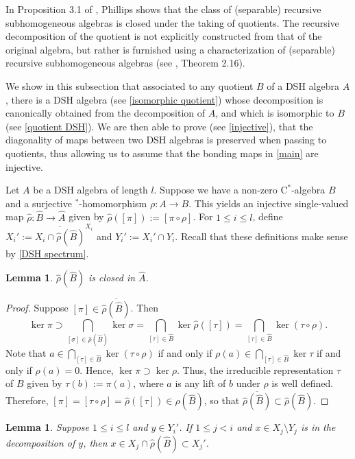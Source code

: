 \documentclass[12pt]{amsart}
\numberwithin{equation}{section}
\newtheorem{lemma}[theorem]{Lemma}
\theoremstyle{definition}
\theoremstyle{remark}
\begin{document}
In Proposition 3.1 of \cite{phil}, Phillips shows that the class of (separable) recursive subhomogeneous algebras is closed under the taking of quotients. The recursive decomposition of the quotient is not explicitly constructed from that of the original algebra, but rather is furnished using a characterization of (separable) recursive subhomogeneous algebras (see \cite{phil}, Theorem 2.16).

We show in this subsection that associated to any quotient $B$ of a DSH algebra $A$, there is a DSH algebra (see \autoref{isomorphic quotient}) whose decomposition is canonically obtained from the decomposition of $A$, and which is isomorphic to $B$ (see \autoref{quotient DSH}). We are then able to prove (see \autoref{injective}), that the diagonality of maps between two DSH algebras is preserved when passing to quotients, thus allowing us to assume that the bonding maps in \autoref{main} are injective.

Let $A$ be a DSH algebra of length $ l$. Suppose we have a non-zero $\mathrm{C}^*$-algebra $B$ and a surjective $^*$-homomorphism $\rho\colon A\to B$. This yields an injective single-valued map $\hat{\rho}\colon\hat{B}\to\hat{A}$ given by $\hat{\rho}([\pi]):=[\pi\circ \rho]$. For $1\leq i\leq  l$, define $X_{i}':=\overline{X_{i}\cap \hat{\rho}(\hat{B})}^{X_{i}}$ and $Y_{i}':=X_{i}'\cap Y_{i}$. Recall that these definitions make sense by \autoref{DSH spectrum}.


\begin{lemma}
	\label{image closed}
	$\hat{\rho}(\hat{B})$ is closed in $\hat{A}$. 
\end{lemma}

\begin{proof}
	Suppose $[\pi]\in\overline{\hat{\rho}(\hat{B})}$. Then 
	$$
	\ker\pi\supset\bigcap_{[\sigma]\in\hat{\rho}(\hat{B})}\ker\sigma=\bigcap_{[\tau]\in \hat{B}}
	\ker\hat{\rho}([\tau])=\bigcap_{[\tau]\in\hat{B}}\ker(\tau\circ\rho).
	$$
	Note that $a\in\bigcap_{[\tau]\in\hat{B}}\ker(\tau\circ\rho)$ if and only if $\rho(a)\in\bigcap_{[\tau]\in\hat{B}}\ker\tau$ if and only if $\rho(a)=0$. Hence, $\ker\pi\supset\ker\rho$. Thus, the irreducible representation $\tau$ of $B$ given by $\tau(b):=\pi(a)$, where $a$ is any lift of $b$ under $\rho$ is well defined. Therefore, $[\pi]=[\tau\circ\rho]=\hat{\rho}([\tau])\in\hat{\rho}(\hat{B})$, so that $\overline{\hat{\rho}(\hat{B})}\subset\hat{\rho}(\hat{B})$. 
\end{proof}


\begin{lemma}
	\label{quotient decomp}
	Suppose $1\leq i\leq  l$ and $y\in Y_{i}'$. If $1\leq j<i$ and $x\in X_{j}\setminus Y_{j}$ is in the decomposition of $y$, then $x\in X_{j}\cap\hat{\rho}(\hat{B})\subset X_{j}'$.  
\end{lemma}
\end{document}
